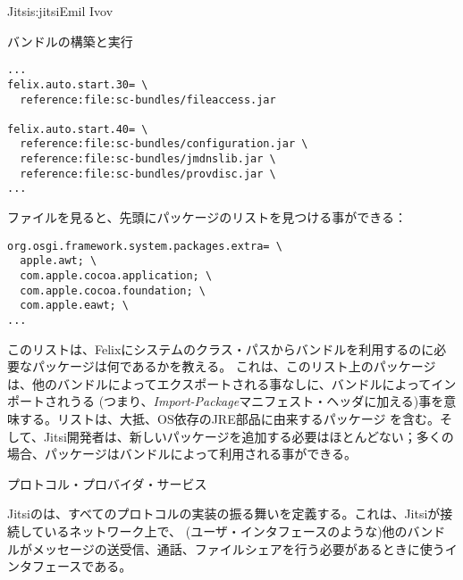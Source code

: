 \begin{aosachapter}{Jitsi}{s:jitsi}{Emil Ivov}
\begin{aosasect1}{バンドルの構築と実行}
\begin{verbatim}
...
felix.auto.start.30= \
  reference:file:sc-bundles/fileaccess.jar

felix.auto.start.40= \
  reference:file:sc-bundles/configuration.jar \
  reference:file:sc-bundles/jmdnslib.jar \
  reference:file:sc-bundles/provdisc.jar \
...
\end{verbatim}

\code{felix.client.run.properties}ファイルを見ると、先頭にパッケージのリストを見つける事ができる：

\begin{verbatim}
org.osgi.framework.system.packages.extra= \
  apple.awt; \
  com.apple.cocoa.application; \
  com.apple.cocoa.foundation; \
  com.apple.eawt; \
...
\end{verbatim}

\noindent このリストは、Felixにシステムのクラス・パスからバンドルを利用するのに必要なパッケージは何であるかを教える。
これは、このリスト上のパッケージは、他のバンドルによってエクスポートされる事なしに、バンドルによってインポートされうる
(つまり、\emph{Import-Package}マニフェスト・ヘッダに加える)事を意味する。リストは、大抵、OS依存のJRE部品に由来するパッケージ
を含む。そして、Jitsi開発者は、新しいパッケージを追加する必要はほとんどない；多くの場合、パッケージはバンドルによって利用される事ができる。

\end{aosasect1}

\begin{aosasect1}{プロトコル・プロバイダ・サービス}

Jitsiの\code{ProtocolProviderService}は、すべてのプロトコルの実装の振る舞いを定義する。これは、Jitsiが接続しているネットワーク上で、
(ユーザ・インタフェースのような)他のバンドルがメッセージの送受信、通話、ファイルシェアを行う必要があるときに使うインタフェースである。


\end{aosasect1}
\end{aosachapter}
